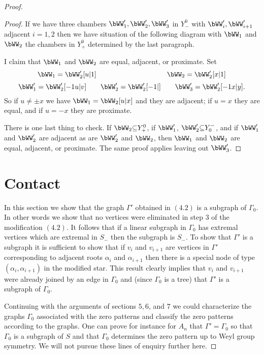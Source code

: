 \documentclass{memo-l}
\theoremstyle{definition}
\theoremstyle{remark}
\numberwithin{section}{chapter}
\numberwithin{equation}{chapter}
\begin{document}
\begin{proof}
\begin{proof}
\medskip
\medskip

   If we have three chambers $\bWW _{1}',
\bWW _{2}', \bWW _{3}'$ in
$Y^{0}_{-}$ with $\bWW _{i}',
\bWW '_{i+1}$ adjacent $i=1,2$ then we
have situation of the following diagram with $\bWW _{1}$ and
$\bWW_{2}$
the chambers in $Y_{+}^{0}$ determined by the last paragraph.

\medskip
\medskip

   I claim that $\bWW_{1}$ and $\bWW_{2}$
are equal, adjacent, or
proximate.  Set
$$
\bWW_{1} = \bWW_{2}'[u\vert 1]
\qquad \qquad \qquad \qquad \qquad
\bWW_{2} = \bWW_{2}'[x\vert 1]
$$
$$
\bWW_{1}' = \bWW_{2}'[-1u\vert v] \qquad
\bWW_{2}' = \bWW_{2}'[-1\vert ] \qquad
\bWW_{3}' = \bWW_{2}'[-1x\vert y] .
$$
So if $u\ne {\pm}x$ we have $\bWW_{1} =
\bWW_{2}[u\vert x]$ and they are
adjacent; if $u = x$ they are equal, and if $u = - x$ they are proximate.


   There is one last thing to check.  If $\bWW_{2}{\subseteq} Y_{+}^{0}$,
if $\bWW_{1}'$, $\bWW_{2}'{\subseteq}Y_{0}^{-}$, and if $\bWW_{1}'$
and $\bWW_{2}'$ are adjacent as are $\bWW_{2}'$ and $\bWW_{2}$, then
$\bWW_{1}$ and $\bWW_{2}$ are equal, adjacent, or proximate.  The same
proof applies leaving out $\bWW_{3}'$.
\end{proof}

\section{{Contact}}

   In this section we show that the graph ${\Gamma}'$ obtained in $(4.2)$
is a subgraph of ${\Gamma}_{0}$.  In other words we show that no vertices
were eliminated in step $3$ of the modification $(4.2)$.  It follows that
if a linear subgraph in ${\Gamma}_{0}$ has extremal vertices which are
extremal in $S_{-}$ then the subgraph is $S_{-}$.  To show that ${\Gamma}'$
is a subgraph it is sufficient to show that if $v_{i}$ and $v_{i+1}$ are
vertices in ${\Gamma}'$ corresponding to adjacent roots ${\alpha}_{i}$ and
${\alpha}_{i+1}$ then there is a special node of type
$({\alpha}_{i},{\alpha}_{i+1})$ in the modified star.  This result clearly
implies that $v_{i}$ and $v_{i+1}$ were already joined by an edge in
${\Gamma}_{0}$ and (since ${\Gamma}_{0}$ is a tree) that ${\Gamma}'$ is a
subgraph of ${\Gamma}_{0}$.

   Continuing with the arguments of sections $5,6$, and $7$ we could
characterize the graphs ${\Gamma}_{0}$ associated with the zero patterns
and classify the zero patterns according to the graphs.  One can prove for
instance for $A_{n}$ that ${\Gamma}'={\Gamma}_{0}$ so that ${\Gamma}_{0}$
is a subgraph of $S$ and that ${\Gamma}_{0}$ determines the zero pattern up
to Weyl group symmetry.  We will not pursue these lines of enquiry further
here.


\end{proof}
\end{document}
